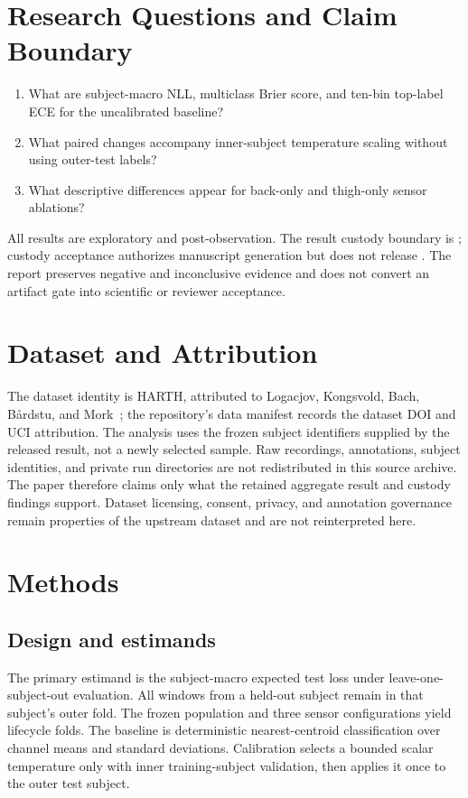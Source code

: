 \documentclass[11pt]{article}
\begin{document}
\section{Research Questions and Claim Boundary}
\begin{enumerate}[label=RQ\arabic*:]
\item What are subject-macro NLL, multiclass Brier score, and ten-bin top-label ECE for the uncalibrated baseline?
\item What paired changes accompany inner-subject temperature scaling without using outer-test labels?
\item What descriptive differences appear for back-only and thigh-only sensor ablations?
\end{enumerate}
All results are exploratory and post-observation. The result custody boundary is ; custody acceptance authorizes manuscript generation but does not release . The report preserves negative and inconclusive evidence and does not convert an artifact gate into scientific or reviewer acceptance.

\section{Dataset and Attribution}
The dataset identity is HARTH, attributed to Logacjov, Kongsvold, Bach, Bårdstu, and Mork~\cite{harth}; the repository's data manifest records the dataset DOI and UCI attribution. The analysis uses the frozen subject identifiers supplied by the released result, not a newly selected sample. Raw recordings, annotations, subject identities, and private run directories are not redistributed in this source archive. The paper therefore claims only what the retained aggregate result and custody findings support. Dataset licensing, consent, privacy, and annotation governance remain properties of the upstream dataset and are not reinterpreted here.

\section{Methods}
\subsection{Design and estimands}
The primary estimand is the subject-macro expected test loss under leave-one-subject-out evaluation. All windows from a held-out subject remain in that subject's outer fold. The frozen population and three sensor configurations yield \resultFolds{} lifecycle folds. The baseline is deterministic nearest-centroid classification over channel means and standard deviations. Calibration selects a bounded scalar temperature only with inner training-subject validation, then applies it once to the outer test subject.
\end{document}
